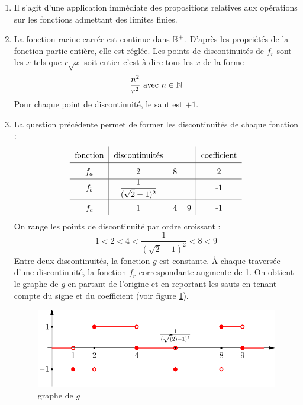 \begin{enumerate}
\item Il s'agit d'une application immédiate des propositions relatives aux opérations sur les fonctions admettant des limites finies.
\item  La fonction racine carrée est continue dans $\mathbb{R}^+$. D'apr\`{e}s les propri\'{e}t\'{e}s de la fonction partie enti\`{e}re, elle est réglée. Les points de discontinuit\'{e}s de $f_r$ sont les $x$ tels que $r\sqrt{x}$ soit entier c'est \`{a} dire tous les $x$ de la forme
\begin{displaymath}
 \frac{n^{2}}{r^{2}} \text{ avec } n\in \mathbb{N}
\end{displaymath}
Pour chaque point de discontinuité, le saut est $+1$.
\item  La question pr\'{e}c\'{e}dente permet de former les discontinuit\'{e}s de chaque fonction : 
\[
\renewcommand{\arraystretch}{1.6}
\begin{tabular}{c|ccc|c}
fonction & discontinuités & & & coefficient\\ \hline
$f_{a}$ & 2 & 8 &  &2\\ \hline
$f_{b}$ & $\dfrac{1}{(\sqrt{2}-1)^{2}}$ &  & &-1 \\ \hline
$f_{c}$ & 1 & 4 & 9 &-1
\end{tabular}
\]
On range les points de discontinuité par ordre croissant :
\begin{displaymath}
1 < 2 < 4 < \frac{1}{(\sqrt{2}-1)^{2}} < 8 < 9 
\end{displaymath}
Entre deux discontinuit\'{e}s, la fonction $g$ est constante. \`A chaque travers\'{e}e d'une discontinuit\'{e}, la fonction $f_{r}$ correspondante augmente de 1. On obtient le graphe de $g$ en partant de l'origine et en reportant les sauts en tenant compte du signe et du coefficient (voir figure \ref{fig:Cdiscont_1}).
\begin{figure}[h!t]
   \centering
   \includegraphics{Cdiscont_1.pdf}
   \caption{graphe de $g$}
   \label{fig:Cdiscont_1}
\end{figure}


\end{enumerate}
